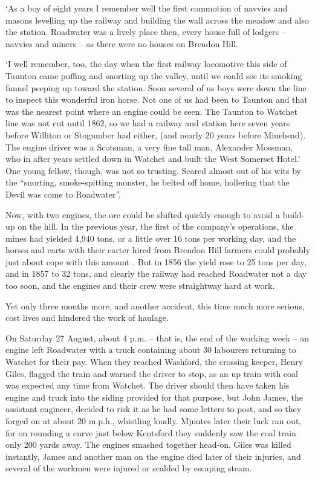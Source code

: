 \documentclass[10pt,a4paper]{article}
\begin{document}
‘As a boy of eight years I remember well the first commotion of navvies and masons levelling up the railway and building the wall across the meadow and also the station. Roadwater was a lively place then, every house full of lodgers – navvies and miners – as there were no houses on Brendon Hill.

‘I well remember, too, the day when the first railway locomotive this side of Taunton came puffing and snorting up the valley, until we could see its smoking funnel peeping up toward the station. Soon several of us boys were down the line to inspect this wonderful iron horse.  Not one of us had been to Taunton and that was the nearest point where an engine could be seen. The Taunton to Watchet line was not cut until 1862, so we had a railway and station here seven years before Williton or Stogumber had either, (and nearly 20 years before Minehead). The engine driver was a Scotsman, a very fine tall man, Alexander Mossman, who in after years settled down in Watchet and built the West Somerset Hotel.’ One young fellow, though, was not so trusting. Scared almost out of his wits by the “snorting, smoke-spitting monster, he belted off home, hollering that the Devil was come to Roadwater”.

Now, with two engines, the ore could be shifted quickly enough to avoid a build-up on the hill. In the previous year, the first of the company’s operations, the mines had yielded 4,940 tons, or a little over 16 tons per working day, and the horses and carts with their carter hired from Brendon Hill farmers could probably just about cope with this amount . But in 1856 the yield   rose to 25 tons per day, and in 1857 to 32 tons, and clearly the railway had reached Roadwater not a day too soon, and the engines and their crew were straightway hard at work.

Yet only three months more, and another accident, this time much more serious, cost lives and hindered the work of haulage.

On Saturday 27 August, about 4 p.m. – that is, the end of the working week – an engine left Roadwater with a truck containing about 30 labourers returning to Watchet for their pay. When they reached Washford, the crossing keeper, Henry Giles, flagged the train and warned the driver to stop, as an up train with coal was expected any time from Watchet.  The driver should then have taken his engine and truck into the siding provided for that purpose, but John James, the assistant engineer, decided to risk it as he had some letters to post, and so they forged on at about 20 m.p.h., whistling loudly. Mjnutes later their luck ran out, for on rounding a curve just below Kentsford they suddenly saw the coal train only 200 yards away. The engines smashed together head-on. Giles was killed instantly, James and another man on the engine died later of their injuries, and several of the workmen were injured or scalded by escaping steam.
\end{document}
